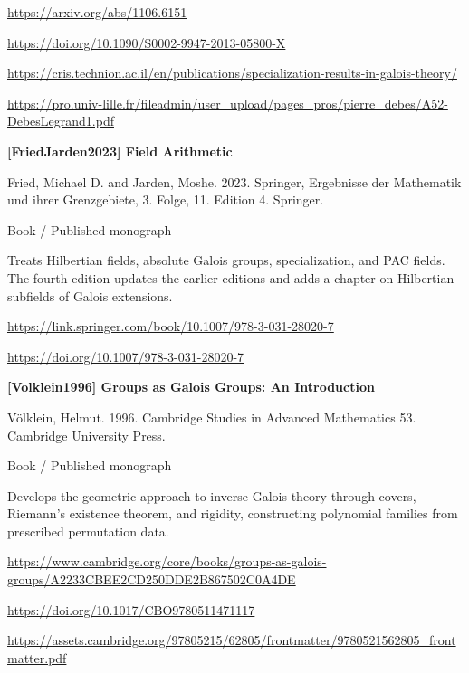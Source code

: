 \documentclass[11pt,a4paper,oneside,openany]{book}
\begin{document}
{\footnotesize\url{https://arxiv.org/abs/1106.6151}}\par
{\footnotesize\url{https://doi.org/10.1090/S0002-9947-2013-05800-X}}\par
{\footnotesize\url{https://cris.technion.ac.il/en/publications/specialization-results-in-galois-theory/}}\par
{\footnotesize\url{https://pro.univ-lille.fr/fileadmin/user_upload/pages_pros/pierre_debes/A52-DebesLegrand1.pdf}}\par
\vspace{9pt}
\hypertarget{ref:FriedJarden2023}{}
{\sffamily\bfseries\color{atlasgreen}[FriedJarden2023] Field Arithmetic}\par
\color{black} Fried, Michael D. and Jarden, Moshe. 2023. Springer, Ergebnisse der Mathematik und ihrer Grenzgebiete, 3. Folge, 11. Edition 4. Springer.\par
{\small\sffamily\color{atlasgold}Book / Published monograph}\par
\color{black} Treats Hilbertian fields, absolute Galois groups, specialization, and PAC fields. The fourth edition updates the earlier editions and adds a chapter on Hilbertian subfields of Galois extensions.\par
{\footnotesize\url{https://link.springer.com/book/10.1007/978-3-031-28020-7}}\par
{\footnotesize\url{https://doi.org/10.1007/978-3-031-28020-7}}\par
\vspace{9pt}
\hypertarget{ref:Volklein1996}{}
{\sffamily\bfseries\color{atlasgreen}[Volklein1996] Groups as Galois Groups: An Introduction}\par
\color{black} Völklein, Helmut. 1996. Cambridge Studies in Advanced Mathematics 53. Cambridge University Press.\par
{\small\sffamily\color{atlasgold}Book / Published monograph}\par
\color{black} Develops the geometric approach to inverse Galois theory through covers, Riemann's existence theorem, and rigidity, constructing polynomial families from prescribed permutation data.\par
{\footnotesize\url{https://www.cambridge.org/core/books/groups-as-galois-groups/A2233CBEE2CD250DDE2B867502C0A4DE}}\par
{\footnotesize\url{https://doi.org/10.1017/CBO9780511471117}}\par
{\footnotesize\url{https://assets.cambridge.org/97805215/62805/frontmatter/9780521562805_frontmatter.pdf}}\par
\end{document}
